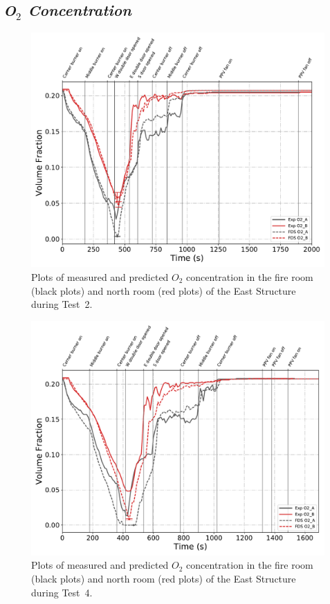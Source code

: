 \subsection*{\textit{O$_2$ Concentration}}
\begin{figure}[!h]
	\centering
	\includegraphics[width=\columnwidth]{Figures/Plots/Validation/Gas_Concentration/Test_2_O2}
	\caption[Plots of measured and predicted $O_2$ concentration during Test~2.]{Plots of measured and predicted $O_2$ concentration in the fire room (black plots) and north room (red plots) of the East Structure during Test~2.}
	\label{fig:Test2_O2}
\end{figure}

\begin{figure}[!h]
	\centering
	\includegraphics[width=\columnwidth]{Figures/Plots/Validation/Gas_Concentration/Test_4_O2}
	\caption[Plots of measured and predicted $O_2$ concentration during Test~4.]{Plots of measured and predicted $O_2$ concentration in the fire room (black plots) and north room (red plots) of the East Structure during Test~4.}
	\label{fig:Test4_O2}
\end{figure}

